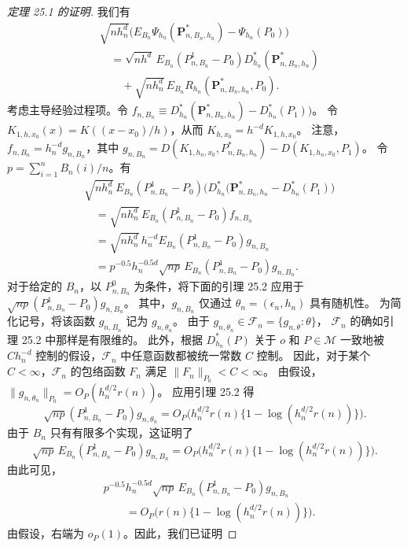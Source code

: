 \begin{proof}[定理 25.1 的证明]
我们有
\[
\begin{aligned}
 &\sqrt{nh_n^d}\bigl(
 E_{B_n}\Psi_{h_n}(\mathbf P^*_{n,B_n,h_n})-\Psi_{h_n}(P_0)\bigr)\\
 &\quad=\sqrt{nh^d}\,E_{B_n}(P^1_{n,B_n}-P_0)
 D_{h_n}^*(\mathbf P^*_{n,B_n,h_n})\\
 &\qquad+\sqrt{nh_n^d}\,E_{B_n}
 R_{h_n}(\mathbf P^*_{n,B_n,h_n},P_0).
\end{aligned}
\]
考虑主导经验过程项。令
$f_{n,B_n}\equiv
D_{h_n}^*(\mathbf P^*_{n,B_n,h_n})-D_{h_n}^*(P_1))$。
令 $K_{1,h,x_0}(x)=K((x-x_0)/h)$，从而
$K_{h,x_0}=h^{-d}K_{1,h,x_0}$。
注意，$f_{n,B_n}=h_n^{-d}g_{n,B_n}$，其中
$g_{n,B_n}=D(K_{1,h_n,x_0},P^*_{n,B_n,h_n})
-D(K_{1,h_n,x_0},P_1)$。
令 $p=\sum_{i=1}^{n}B_n(i)/n$。有
\[
\begin{aligned}
 &\sqrt{nh_n^d}\,E_{B_n}(P^1_{n,B_n}-P_0)
 \bigl(D_{h_n}^*(\mathbf P^*_{n,B_n,h_n}-D_{h_n}^*(P_1)\bigr)\\
 &\quad=\sqrt{nh_n^d}\,E_{B_n}(P^1_{n,B_n}-P_0)f_{n,B_n}\\
 &\quad=\sqrt{nh_n^d}\,h_n^{-d}E_{B_n}
 (P^1_{n,B_n}-P_0)g_{n,B_n}\\
 &\quad=p^{-0.5}h_n^{-0.5d}\sqrt{np}\,E_{B_n}
 (P^1_{n,B_n}-P_0)g_{n,B_n}.
\end{aligned}
\]
对于给定的 $B_n$，以 $P^0_{n,B_n}$ 为条件，将下面的引理 25.2 应用于
$\sqrt{np}(P^1_{n,B_n}-P_0)g_{n,B_n}$。
其中，$g_{n,B_n}$ 仅通过 $\theta_n=(\epsilon_n,h_n)$ 具有随机性。
为简化记号，将该函数 $g_{n,B_n}$ 记为 $g_{n,\theta_n}$。
由于 $g_{n,\theta_n}\in\mathcal F_n=\{g_{n,\theta}:\theta\}$，
$\mathcal F_n$ 的确如引理 25.2 中那样是有限维的。
此外，根据 $D_{h_n}^*(P)$ 关于 $o$ 和 $P\in\mathcal M$ 一致地被
$Ch_n^{-d}$ 控制的假设，$\mathcal F_n$ 中任意函数都被统一常数 $C$ 控制。
因此，对于某个 $C<\infty$，$\mathcal F_n$ 的包络函数 $F_n$ 满足
$\|F_n\|_{P_0}<C<\infty$。
由假设，$\|g_{n,\theta_n}\|_{P_0}=O_P(h_n^{d/2}r(n))$。
应用引理 25.2 得
\[
 \sqrt{np}(P^1_{n,B_n}-P_0)g_{n,\theta_n}
 =O_P\bigl(h_n^{d/2}r(n)\{1-\log(h_n^{d/2}r(n))\}\bigr).
\]
由于 $B_n$ 只有有限多个实现，这证明了
\[
 \sqrt{np}\,E_{B_n}(P^1_{n,B_n}-P_0)g_{n,B_n}
 =O_P\bigl(h_n^{d/2}r(n)\{1-\log(h_n^{d/2}r(n))\}\bigr).
\]
由此可见，
\[
\begin{aligned}
 &p^{-0.5}h_n^{-0.5d}\sqrt{np}\,E_{B_n}
 (P^1_{n,B_n}-P_0)g_{n,B_n}\\
 &\qquad=O_P\bigl(r(n)\{1-\log(h_n^{d/2}r(n))\}\bigr).
\end{aligned}
\]
由假设，右端为 $o_P(1)$。因此，我们已证明

\end{proof}
